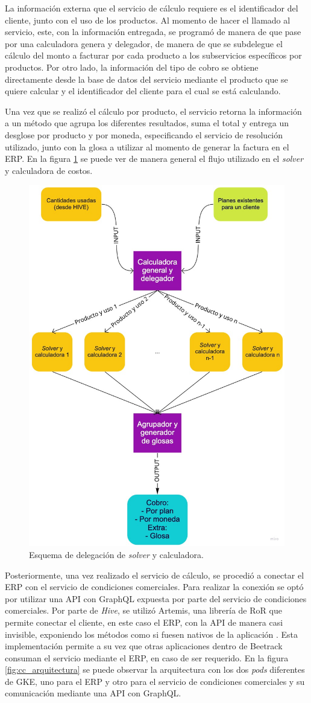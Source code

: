     La información externa que el servicio de cálculo requiere es el identificador del cliente, junto con el uso de los productos. Al momento de hacer el llamado al servicio, este, con la información entregada, se programó de manera de que pase por una calculadora genera y delegador, de manera de que se subdelegue el cálculo del monto a facturar por cada producto a los subservicios específicos por productos. Por otro lado, la información del tipo de cobro se obtiene directamente desde la base de datos del servicio mediante el producto que se quiere calcular y el identificador del cliente para el cual se está calculando.
    
    Una vez que se realizó el cálculo por producto, el servicio retorna la información a un método que agrupa los diferentes resultados, suma el total y entrega un desglose por producto y por moneda, especificando el servicio de resolución utilizado, junto con la glosa a utilizar al momento de generar la factura en el ERP. En la figura \ref{fig:cc_calculator} se puede ver de manera general el flujo utilizado en el \textit{solver} y calculadora de costos.

    \begin{figure}
      \centering
      \includegraphics[width=0.5\linewidth]{figures/cc/cc_calculator.jpg}
      \caption{Esquema de delegación de \textit{solver} y calculadora.}
      \label{fig:cc_calculator}
    \end{figure}


    Posteriormente, una vez realizado el servicio de cálculo, se procedió a conectar el ERP con el servicio de condiciones comerciales. Para realizar la conexión se optó por utilizar una API con GraphQL expuesta por parte del servicio de condiciones comerciales. Por parte de \textit{Hive}, se utilizó Artemis, una librería de RoR que permite conectar el cliente, en este caso el ERP, con la API de manera casi invisible, exponiendo los métodos como si fuesen nativos de la aplicación \cite{artemis_gem}. Esta implementación permite a su vez que otras aplicaciones dentro de Beetrack consuman el servicio mediante el ERP, en caso de ser requerido. En la figura \ref{fig:cc_arquitectura} se puede observar la arquitectura con los dos \textit{pods} diferentes de GKE, uno para el ERP y otro para el servicio de condiciones comerciales y su comunicación mediante una API con GraphQL.

